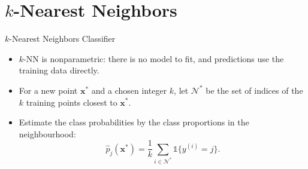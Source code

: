 



\section{\texorpdfstring{$k$}{k}-Nearest Neighbors}


\begin{frame}{\texorpdfstring{$k$}{k}-Nearest Neighbors Classifier}
    \begin{itemize}
        \item $k$-NN is nonparametric: there is no model to fit, and predictions use the training data directly.
        \item For a new point $\mathbf{x}^\ast$ and a chosen integer $k$, let $\mathcal{N}^\ast$ be the set of indices of the $k$ training points closest to $\mathbf{x}^\ast$.
        \item Estimate the class probabilities by the class proportions in the neighbourhood:
        \[
            \hat{p}_j(\mathbf{x}^\ast) = \frac{1}{k} \sum_{i \in \mathcal{N}^\ast} \mathbb{1}\{y^{(i)} = j\}.
        \]
    \end{itemize}
\end{frame}


